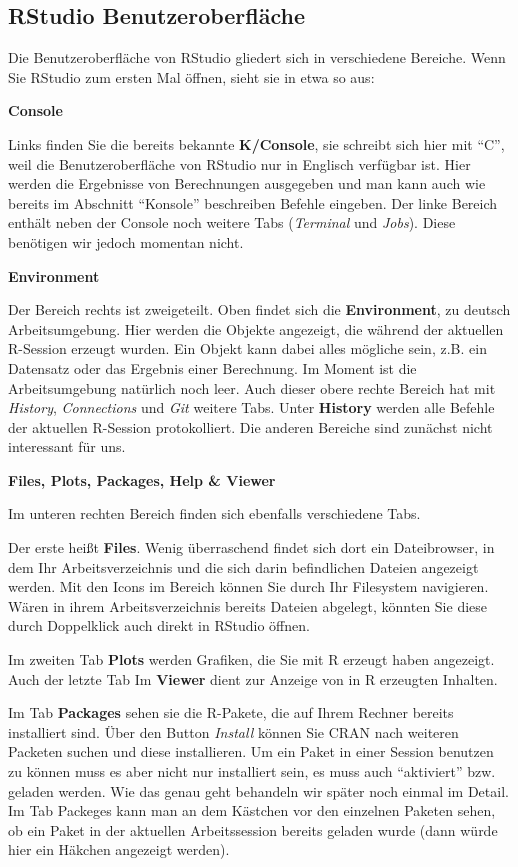 \documentclass[
]{book}
\begin{document}
\hypertarget{rstudio-benutzeroberfluxe4che}{%
\subsection{RStudio Benutzeroberfläche}\label{rstudio-benutzeroberfluxe4che}}

Die Benutzeroberfläche von RStudio gliedert sich in verschiedene Bereiche.
Wenn Sie RStudio zum ersten Mal öffnen, sieht sie in etwa so aus:

\textbf{Console}

Links finden Sie die bereits bekannte \textbf{K/Console}, sie schreibt sich hier mit ``C'', weil die Benutzeroberfläche von RStudio nur in Englisch verfügbar ist. Hier werden die Ergebnisse von Berechnungen ausgegeben und man kann auch wie bereits im Abschnitt ``Konsole'' beschreiben Befehle eingeben. Der linke Bereich enthält neben der Console noch weitere Tabs (\emph{Terminal} und \emph{Jobs}). Diese benötigen wir jedoch momentan nicht.

\textbf{Environment}

Der Bereich rechts ist zweigeteilt. Oben findet sich die \textbf{Environment}, zu deutsch Arbeitsumgebung.
Hier werden die Objekte angezeigt, die während der aktuellen R-Session erzeugt wurden. Ein Objekt kann dabei alles mögliche sein, z.B. ein Datensatz oder das Ergebnis einer Berechnung. Im Moment ist die Arbeitsumgebung natürlich noch leer. Auch dieser obere rechte Bereich hat mit \emph{History}, \emph{Connections} und \emph{Git} weitere Tabs. Unter \textbf{History} werden alle Befehle der aktuellen R-Session protokolliert. Die anderen Bereiche sind zunächst nicht interessant für uns.

\textbf{Files, Plots, Packages, Help \& Viewer}

Im unteren rechten Bereich finden sich ebenfalls verschiedene Tabs.

Der erste heißt \textbf{Files}. Wenig überraschend findet sich dort ein Dateibrowser, in dem Ihr Arbeitsverzeichnis und die sich darin befindlichen Dateien angezeigt werden.
Mit den Icons im Bereich können Sie durch Ihr Filesystem navigieren.
Wären in ihrem Arbeitsverzeichnis bereits Dateien abgelegt, könnten Sie diese durch Doppelklick auch direkt in RStudio öffnen.

Im zweiten Tab \textbf{Plots} werden Grafiken, die Sie mit R erzeugt haben angezeigt.
Auch der letzte Tab Im \textbf{Viewer} dient zur Anzeige von in R erzeugten Inhalten.

Im Tab \textbf{Packages} sehen sie die R-Pakete, die auf Ihrem Rechner bereits installiert sind.
Über den Button \emph{Install} können Sie CRAN nach weiteren Packeten suchen und diese installieren.
Um ein Paket in einer Session benutzen zu können muss es aber nicht nur installiert sein, es muss auch ``aktiviert'' bzw. geladen werden. Wie das genau geht behandeln wir später noch einmal im Detail.
Im Tab Packeges kann man an dem Kästchen vor den einzelnen Paketen sehen, ob ein Paket in der aktuellen Arbeitssession bereits geladen wurde (dann würde hier ein Häkchen angezeigt werden).
\end{document}

